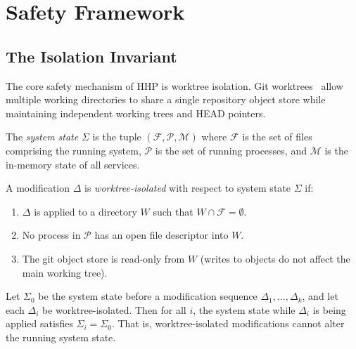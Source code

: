 \section{Safety Framework}

\label{sec:safety}

\subsection{The Isolation Invariant}
\label{sec:isolation}

The core safety mechanism of HHP is worktree isolation. Git worktrees~\cite{git2015worktree}
allow multiple working directories to share a single repository object store
while maintaining independent working trees and HEAD pointers.

\begin{definition}
The \emph{system state} $\Sigma$ is the tuple $(\mathcal{F}, \mathcal{P}, \mathcal{M})$
where $\mathcal{F}$ is the set of files comprising the running system,
$\mathcal{P}$ is the set of running processes, and $\mathcal{M}$ is the in-memory
state of all services.
\end{definition}

\begin{definition}
\label{def:isolation}
A modification $\Delta$ is \emph{worktree-isolated} with respect to system state
$\Sigma$ if:
\begin{enumerate}[leftmargin=1.5em]
    \item $\Delta$ is applied to a directory $W$ such that $W \cap \mathcal{F} = \emptyset$.
    \item No process in $\mathcal{P}$ has an open file descriptor into $W$.
    \item The git object store is read-only from $W$ (writes to objects do not
          affect the main working tree).
\end{enumerate}
\end{definition}

\begin{theorem}
\label{thm:isolation}
Let $\Sigma_0$ be the system state before a modification sequence
$\Delta_1, \ldots, \Delta_k$, and let each $\Delta_i$ be worktree-isolated.
Then for all $i$, the system state while $\Delta_i$ is being applied satisfies
$\Sigma_i = \Sigma_0$. That is, worktree-isolated modifications cannot alter
the running system state.
\end{theorem}

